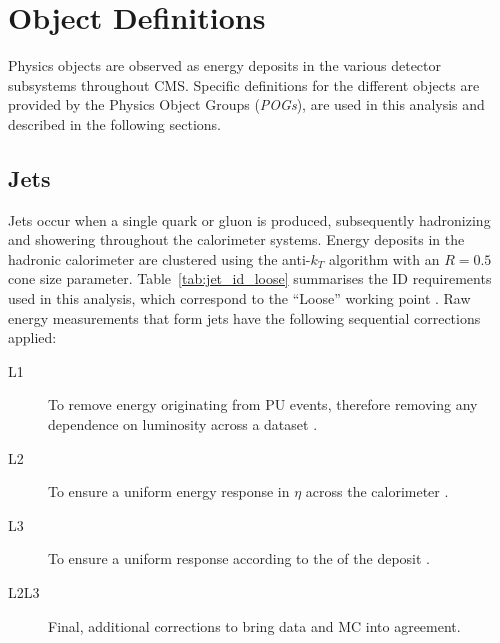 \chapter{Object Definitions}
\label{ch:objects}

\ifpdf
    \graphicspath{{Chapter4/Figs/Raster/}{Chapter4/Figs/PDF/}{Chapter4/Figs/}}
\else
    \graphicspath{{Chapter4/Figs/Vector/}{Chapter4/Figs/}}
\fi



Physics objects are observed as energy deposits in the various detector 
subsystems throughout CMS. Specific definitions for the different 
objects are provided by the Physics Object Groups (\emph{POGs}), are used in
this analysis and described in the following sections.


\section{Jets}  %
\label{sec:objects_jets}

Jets occur when a single quark or gluon is produced, subsequently 
hadronizing and showering throughout the calorimeter systems. Energy deposits in
the hadronic calorimeter are clustered using the anti-$k_T$ algorithm \cite{antikt} with
an $R=0.5$ cone size parameter.
Table~\ref{tab:jet_id_loose} summarises the ID requirements used in this 
analysis, which correspond to the ``Loose'' working point \cite{ref:jet-id}.
Raw energy measurements that form jets have the following sequential
corrections \cite{ref:jet-jes, 2011JInst...611002C} applied:
\begin{description}
\item[L1] To remove energy originating from PU events, therefore removing any
dependence on luminosity across a dataset \cite{Cacciari2008119, 1126-6708-2008-04-005}.
\item[L2] To ensure a uniform energy response in $\eta$ across the calorimeter \cite{Chatrchyan:2011ds}.
\item[L3] To ensure a uniform response according to the \Pt of the deposit \cite{Chatrchyan:2011ds}.
\item[L2L3] Final, additional corrections to bring data and MC into agreement.
\end{description}


